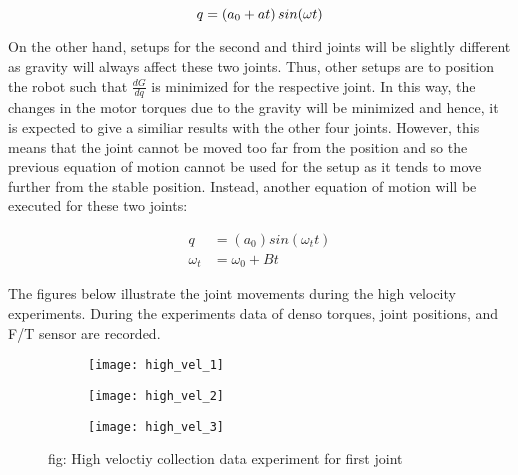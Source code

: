 \begin{equation}
  q = \left(a_{0} + at\right) sin(\omega t)\\
\end{equation}

On the other hand, setups for the second and third joints will be slightly different as gravity will always affect these two joints. Thus, other setups are to position the robot such that $\frac{dG}{dq}$ is minimized for the respective joint. In this way, the changes in the motor torques due to the gravity will be minimized and hence, it is expected to give a similiar results with the other four joints. However, this means that the joint cannot be moved too far from the position and so the previous equation of motion cannot be used for the setup as it tends to move further from the stable position. Instead, another equation of motion will be executed for these two joints:

\begin{align}
  q &= \left(a_{0}\right) sin(\omega_{t} t)\\
  \omega_{t} &= \omega_{0} + B t 
\end{align}

The figures below illustrate the joint movements during the high velocity experiments. During the experiments data of denso torques, joint positions, and F/T sensor are recorded.
\begin{figure}[H]
\centering  
  \begin{subfigure}[t]{0.3\textwidth}
    \centering
    \texttt{[image: high\_vel\_1]} 
  \end{subfigure}
  \begin{subfigure}[t]{0.3\textwidth}
    \centering
    \texttt{[image: high\_vel\_2]}
  \end{subfigure}
  \begin{subfigure}[t]{0.3\textwidth}
    \centering
    \texttt{[image: high\_vel\_3]}
  \end{subfigure}
  \caption{fig: High veloctiy collection data experiment for first joint}
\end{figure}
